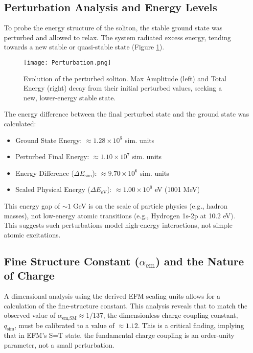 \documentclass[11pt]{article}
\begin{document}
\subsection{Perturbation Analysis and Energy Levels}
To probe the energy structure of the soliton, the stable ground state was perturbed and allowed to relax. The system radiated excess energy, tending towards a new stable or quasi-stable state (Figure \ref{fig:perturbed_evolution}).
\begin{figure}[htbp]
    \centering
    \texttt{[image: Perturbation.png]}
    \caption{Evolution of the perturbed soliton. Max Amplitude (left) and Total Energy (right) decay from their initial perturbed values, seeking a new, lower-energy stable state.}
    \label{fig:perturbed_evolution}
\end{figure}
The energy difference between the final perturbed state and the ground state was calculated:
\begin{itemize}
    \item Ground State Energy: \( \approx 1.28 \times 10^6 \) sim. units
    \item Perturbed Final Energy: \( \approx 1.10 \times 10^7 \) sim. units
    \item Energy Difference (\(\Delta E_{\text{sim}}\)): \( \approx 9.70 \times 10^6 \) sim. units
    \item Scaled Physical Energy (\(\Delta E_{\text{eV}}\)): \( \approx 1.00 \times 10^9 \) eV (1001 MeV)
\end{itemize}
This energy gap of \(\sim 1\) GeV is on the scale of particle physics (e.g., hadron masses), not low-energy atomic transitions (e.g., Hydrogen 1s-2p at 10.2 eV). This suggests such perturbations model high-energy interactions, not simple atomic excitations.

\subsection{Fine Structure Constant (\(\alpha_{\text{em}}\)) and the Nature of Charge}
A dimensional analysis using the derived EFM scaling units allows for a calculation of the fine-structure constant. This analysis reveals that to match the observed value of \(\alpha_{\text{em,SM}} \approx 1/137\), the dimensionless charge coupling constant, \(q_{\text{sim}}\), must be calibrated to a value of \textbf{\(\approx 1.12\)}. This is a critical finding, implying that in EFM's S=T state, the fundamental charge coupling is an order-unity parameter, not a small perturbation.
\end{document}
